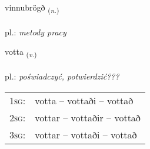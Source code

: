 \documentclass[frontgrid, backgrid]{flacards}\usepackage[]{graphicx}\usepackage[]{xcolor}
\begin{document}
\renewcommand{\blhead}{\vskip5pt {\small\bfseries\footnotesize Nafnorð | rzeczownik }}
\renewcommand{\bcfoot}{\vskip5pt \hspace{2pt}{\small\bfseries\footnotesize 3K}}


{vinnubrögð \small{\textsubscript{(\textit{n.})}} \\[1ex] %
\textphonetic{[vɪnʏprœɣð]} \\
pl.: \emph{metody pracy} \\  [2ex]
\renewcommand*{\arraystretch}{0.8}
}

\renewcommand{\flhead}{\vskip5pt \fboxsep=0pt {\small\bfseries\footnotesize Sagnorð | czasownik}}
\renewcommand{\fcfoot}{\vskip5pt \fboxsep=0pt \hspace{2pt}{\small\bfseries\footnotesize 3K}}

\renewcommand{\blhead}{\vskip5pt {\small\bfseries\footnotesize Sagnorð | czasownik }}
\renewcommand{\bcfoot}{\vskip5pt \hspace{2pt}{\small\bfseries\footnotesize 3K}}


{votta \small{\textsubscript{(\textit{v.})}} \\[1ex] %
\textphonetic{[vɔhta]} \\
pl.: \emph{poświadczyć, potwierdzić???} \\  [2ex]
\renewcommand*{\arraystretch}{0.8}
\begin{tabular}{p{1cm}l}
\textsc{1sg}: & votta -- vottaði -- vottað \\ 
\textsc{2sg}: & vottar -- vottaðir -- vottað \\ 
\textsc{3sg}: & vottar -- vottaði -- vottað \\ 
\end{tabular}
}
\end{document}
